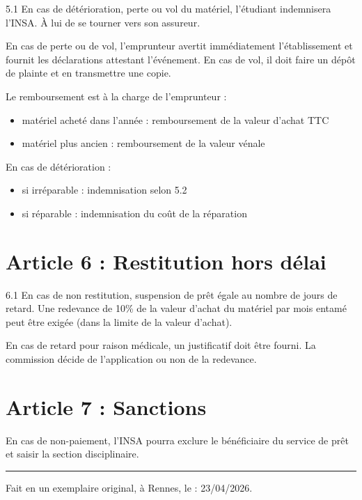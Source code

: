 \documentclass[12pt,a4paper]{article}
\begin{document}
5.1 En cas de détérioration, perte ou vol du matériel, l’étudiant indemnisera l’INSA. À lui de se tourner vers son assureur.

 En cas de perte ou de vol, l’emprunteur avertit immédiatement l’établissement et fournit les déclarations attestant l’événement.  
En cas de vol, il doit faire un dépôt de plainte et en transmettre une copie.  

Le remboursement est à la charge de l’emprunteur :
\begin{itemize}
    \item matériel acheté dans l’année : remboursement de la valeur d’achat TTC
    \item matériel plus ancien : remboursement de la valeur vénale
\end{itemize}

 En cas de détérioration :
\begin{itemize}
    \item si irréparable : indemnisation selon 5.2
    \item si réparable : indemnisation du coût de la réparation
\end{itemize}

\section*{Article 6 : Restitution hors délai}

6.1 En cas de non restitution, suspension de prêt égale au nombre de jours de retard.  
Une redevance de 10\% de la valeur d’achat du matériel par mois entamé peut être exigée (dans la limite de la valeur d’achat).

 En cas de retard pour raison médicale, un justificatif doit être fourni. La commission décide de l’application ou non de la redevance.

\section*{Article 7 : Sanctions}

En cas de non-paiement, l’INSA pourra exclure le bénéficiaire du service de prêt et saisir la section disciplinaire.

\vspace{0.5cm}
\rule{\linewidth}{1pt}
\vspace{0.5cm}

Fait en un exemplaire original, à Rennes, le : 23/04/2026.
\end{document}
